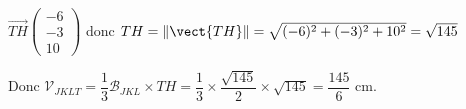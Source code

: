 \begin{enumerate}
\begin{enumerate}
\(\overrightarrow{TH}\begin{pmatrix}-6\\-3\\10\end{pmatrix}\) donc $TH= \left\|\vect{TH}\right\| = \sqrt{(-6)^2+(-3)^2+10^2}=\sqrt{145}$

Donc $\mathcal{V}_{JKLT}  = \dfrac13 \mathcal{B}_{JKL} \times TH=\dfrac13 \times \dfrac{\sqrt{145}}{2} \times \sqrt{145}= \dfrac{145}{6} $ cm.
	\end{enumerate}

\end{enumerate}
\bigskip
